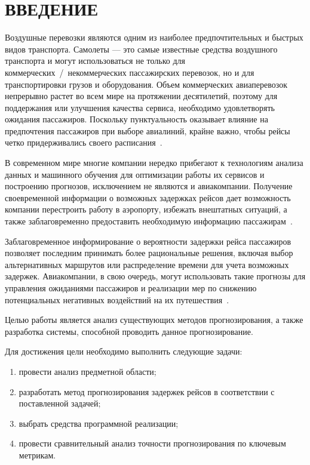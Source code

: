 \chapter*{ВВЕДЕНИЕ}

Воздушные перевозки являются одним из наиболее предпочтительных и быстрых видов транспорта.
Самолеты --- это самые известные средства воздушного транспорта и могут использоваться не только для коммерческих~/~некоммерческих пассажирских перевозок, но и для транспортировки грузов и оборудования.
Объем коммерческих авиаперевозок непрерывно растет во всем мире на протяжении десятилетий, поэтому для поддержания или улучшения качества сервиса, необходимо удовлетворять ожидания пассажиров.
Поскольку пунктуальность оказывает влияние на предпочтения пассажиров при выборе авиалиний, крайне важно, чтобы рейсы четко придерживались своего расписания~\cite{tat}.

В современном мире многие компании нередко прибегают к технологиям анализа данных и машинного обучения для оптимизации работы их сервисов и построению прогнозов, исключением не являются и авиакомпании.
Получение своевременной информации о возможных задержках рейсов дает возможность компании перестроить работу в аэропорту, избежать внештатных ситуаций, а также заблаговременно предоставить необходимую информацию пассажирам~\cite{nozdrin}.

Заблаговременное информирование о вероятности задержки рейса пассажиров позволяет последним принимать более рациональные решения, включая выбор альтернативных маршрутов или распределение времени для учета возможных задержек.
Авиакомпании, в свою очередь, могут использовать такие прогнозы для управления ожиданиями пассажиров и реализации мер по снижению потенциальных негативных воздействий на их путешествия~\cite{trt}.

Целью работы является анализ существующих методов прогнозирования, а также разработка системы, способной проводить данное прогнозирование.

Для достижения цели необходимо выполнить следующие задачи:
\begin{enumerate}[label=\arabic*)]
    \item провести анализ предметной области;
    \item разработать метод прогнозирования задержек рейсов в соответствии с поставленной задачей;
    \item выбрать средства программной реализации;
    \item провести сравнительный анализ точности прогнозирования по ключевым метрикам.
\end{enumerate}

